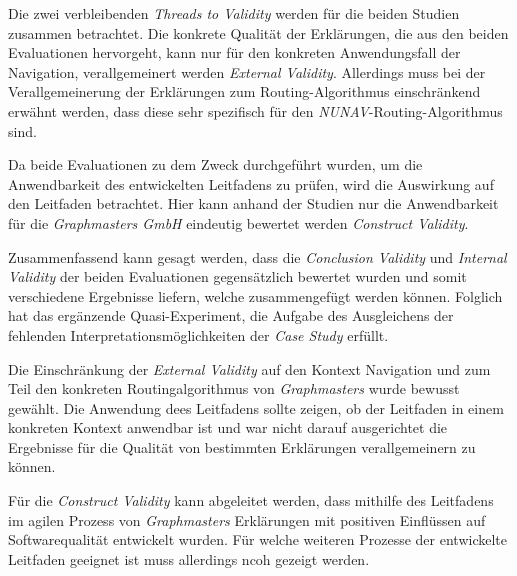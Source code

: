 \smallskip

Die zwei verbleibenden \textit{Threads to Validity} werden für die beiden Studien zusammen betrachtet. Die konkrete Qualität der Erklärungen, die aus den beiden Evaluationen hervorgeht, kann nur für den konkreten Anwendungsfall der Navigation, verallgemeinert werden \textit{External Validity}. Allerdings muss bei der Verallgemeinerung der Erklärungen zum Routing-Algorithmus einschränkend erwähnt werden, dass diese sehr spezifisch für den \textit{NUNAV}-Routing-Algorithmus sind.

Da beide Evaluationen zu dem Zweck durchgeführt wurden, um die Anwendbarkeit des entwickelten Leitfadens zu prüfen, wird die Auswirkung auf den Leitfaden betrachtet. Hier kann anhand der Studien nur die Anwendbarkeit für die \textit{Graphmasters GmbH} eindeutig bewertet werden \textit{Construct Validity}. 

\smallskip

Zusammenfassend kann gesagt werden, dass die \textit{Conclusion Validity} und \textit{Internal Validity} der beiden Evaluationen gegensätzlich bewertet wurden und somit verschiedene Ergebnisse liefern, welche zusammengefügt werden können. Folglich hat das ergänzende Quasi-Experiment, die Aufgabe des Ausgleichens der fehlenden Interpretationsmöglichkeiten der \textit{Case Study} erfüllt.

Die Einschränkung der \textit{External Validity} auf den Kontext Navigation und zum Teil den konkreten Routingalgorithmus von \textit{Graphmasters} wurde bewusst gewählt. Die Anwendung dees Leitfadens sollte zeigen, ob der Leitfaden in einem konkreten Kontext anwendbar ist und war nicht darauf ausgerichtet die Ergebnisse für die Qualität von bestimmten Erklärungen verallgemeinern zu können.

Für die \textit{Construct Validity} kann abgeleitet werden, dass mithilfe des Leitfadens im agilen Prozess von \textit{Graphmasters} Erklärungen mit positiven Einflüssen auf Softwarequalität entwickelt wurden. Für welche weiteren Prozesse der entwickelte Leitfaden geeignet ist muss allerdings ncoh gezeigt werden.
